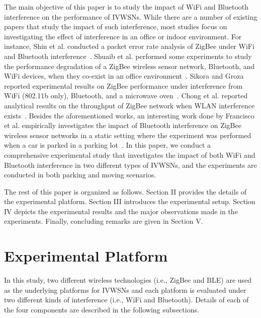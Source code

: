 \documentclass[journal]{IEEEtran}
\begin{document}
The main objective of this paper is to study the impact of WiFi and Bluetooth interference on the performance of IVWSNs. While there are a number of existing papers that study the impact of such interference, most studies focus on investigating the effect of interference in an office or indoor environment. For instance, Shin et al. conducted a packet error rate analysis of ZigBee under WiFi and Bluetooth interference~\cite{Shin2007}. Shuaib et al. performed some experiments to study the performance degradation of a ZigBee wireless sensor network, Bluetooth, and WiFi devices, when they co-exist in an office environment~\cite{Shuaib2006}. Sikora and Groza reported experimental results on ZigBee performance under interference from WiFi (802.11b only), Bluetooth, and a microwave oven~\cite{Sikora05}. Chong et al. reported analytical results on the throughput of ZigBee network when WLAN interference exists~\cite{chong2007an}. Besides the aforementioned works, an interesting work done by Francisco et al. empirically investigates the impact of Bluetooth interference on ZigBee wireless sensor networks in a static setting where the experiment was performed when a car is parked in a parking lot~\cite{Francisco2009}. In this paper, we conduct a comprehensive experimental study that investigates the impact of both WiFi and Bluetooth interference in two different types of IVWSNs, and the experiments are conducted in both parking and moving scenarios.





The rest of this paper is organized as follows. Section II provides the details of the experimental platform. Section III introduces the experimental setup. Section IV depicts the experimental results and the major observations made in the experiments. 
Finally, concluding remarks are given in Section V.


\section{Experimental Platform}


In this study, two different wireless technologies (i.e., ZigBee and BLE) are used as the underlying platforms for IVWSNs and each platform is evaluated under two different kinds of interference (i.e., WiFi and Bluetooth). Details of each of the four components are described in the following subsections.
\end{document}
